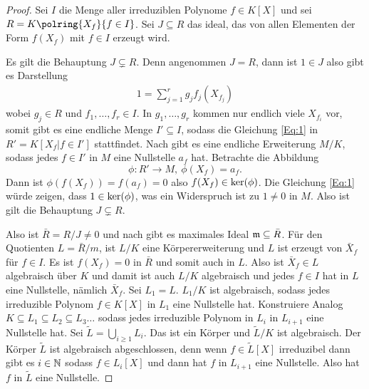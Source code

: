 \begin{proof}
    Sei \(I\) die Menge aller irreduziblen Polynome \(f\in K[X]\) und sei \(R=K\polring{X_f}{f\in I}\). Sei \(J\subseteq R\) das ideal, das von allen Elementen der Form \(f(X_f)\) mit \(f\in I\) erzeugt wird.
    
    Es gilt die Behauptung \(J\subsetneq R\). Denn angenommen \(J=R\), dann ist \(1\in J\) also gibt es Darstellung 
    \begin{align} 1=\sum_{j=1}^rg_jf_j(X_{f_j})\label{Eq:1}
    \end{align} wobei \(g_j\in R\) und \(f_1,\dots,f_r\in I\). In \(g_1,\dots,g_r\) kommen nur endlich viele \(X_{f_i}\) vor, somit gibt es eine endliche Menge \(I'\subseteq I\), sodass die Gleichung \ref{Eq:1} in \(R'=K[X_f| f\in I']\) stattfindet.
    Nach  gibt es eine endliche Erweiterung \(M/K\), sodass jedes \(f\in I'\) in \(M\) eine Nullstelle \(a_f\) hat. Betrachte die Abbildung \[\phi\colon R'\to M,\ \phi(X_f)=a_f.\]
    Dann ist \(\phi(f(X_f))=f(a_f)=0\) also \(f(X_f)\in \operatorname{ker}(\phi)\). Die Gleichung \ref{Eq:1} würde zeigen, dass \(1\in \operatorname{ker}(\phi)\), was ein Widerspruch ist zu \(1\neq 0\) in \(M\).
    Also ist gilt die Behauptung \(J\subsetneq R\).
    
    Also ist \(\bar R=R/J\neq 0\) und nach  gibt es maximales Ideal \(\mathfrak{m}\subseteq \bar R\). Für den Quotienten \(L=\bar R/m\), ist \(L/K\) eine Körpererweiterung und \(L\) ist erzeugt von \(\bar X_f\) für \(f\in I\). Es ist \(f(X_f)=0\) in \(\bar R\) und somit auch in \(L\). Also ist \(\bar X_f\in L\) algebraisch über \(K\) und damit ist auch \(L/K\) algebraisch und jedes \(f\in I\) hat in \(L\) eine Nullstelle, nämlich \(\bar X_f\).
    Sei \(L_1=L\). \(L_1/K\) ist algebraisch, sodass jedes irreduzible Polynom \(f\in K[X]\) in \(L_1\) eine Nullstelle hat.
    Konstruiere Analog \(K\subseteq L_1\subseteq L_2\subseteq L_3\dots\) sodass jedes irreduzible Polynom in \(L_i\) in \(L_{i+1}\) eine Nullstelle hat. Sei \(\tilde L= \bigcup\limits_{i\geq 1}L_i\). Das ist  ein Körper und \(\tilde L/K\) ist algebraisch.
    Der Körper \(\tilde L\) ist algebraisch abgeschlossen, denn wenn \(f\in \tilde L[X]\) irreduzibel dann gibt es \(i\in\mathbb{N}\) sodass \(f\in L_i[X]\) und dann hat \(f\) in \(L_{i+1}\) eine Nullstelle. Also hat \(f\) in \(\tilde L\) eine Nullstelle.
\end{proof}
